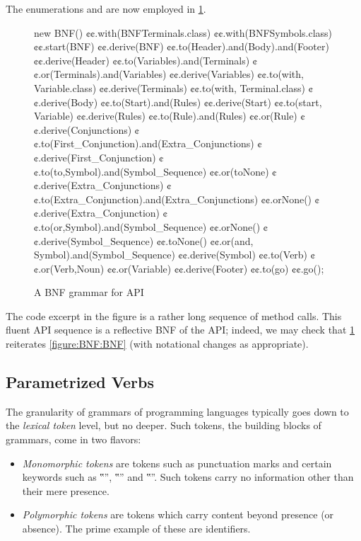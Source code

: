 The
enumerations  and
  are now employed in \cref{figure:BNF:fluent}.

\begin{figure}[htb]
  \begin{JAVA}[style=numbered]
new BNF()
  ¢¢.with(BNFTerminals.class)
  ¢¢.with(BNFSymbols.class)
  ¢¢.start(BNF)
  ¢¢.derive(BNF)
    ¢¢.to(Header).and(Body).and(Footer)
  ¢¢.derive(Header)
    ¢¢.to(Variables).and(Terminals)
    ¢¢.or(Terminals).and(Variables)
  ¢¢.derive(Variables)
    ¢¢.to(with, Variable.class)
  ¢¢.derive(Terminals)
    ¢¢.to(with, Terminal.class)
  ¢¢.derive(Body)
    ¢¢.to(Start).and(Rules)
  ¢¢.derive(Start)
    ¢¢.to(start, Variable)
  ¢¢.derive(Rules)
    ¢¢.to(Rule).and(Rules)
    ¢¢.or(Rule)
  ¢¢.derive(Conjunctions)
    ¢¢.to(First_Conjunction).and(Extra_Conjunctions)
  ¢¢.derive(First_Conjunction)
    ¢¢.to(to,Symbol).and(Symbol_Sequence)
    ¢¢.or(toNone)
  ¢¢.derive(Extra_Conjunctions)
    ¢¢.to(Extra_Conjunction).and(Extra_Conjunctions)
    ¢¢.orNone()
  ¢¢.derive(Extra_Conjunction)
    ¢¢.to(or,Symbol).and(Symbol_Sequence)
    ¢¢.orNone()
  ¢¢.derive(Symbol_Sequence)
    ¢¢.toNone()
    ¢¢.or(and, Symbol).and(Symbol_Sequence)
  ¢¢.derive(Symbol)
    ¢¢.to(Verb)
    ¢¢.or(Verb,Noun)
    ¢¢.or(Variable)
  ¢¢.derive(Footer)
    ¢¢.to(go)
¢¢.go();
  \end{JAVA}
  \caption{A BNF grammar for \Self API}
  \label{figure:BNF:fluent}
\end{figure}

The code excerpt in the figure is a rather long
sequence of method calls.
This fluent API sequence is a reflective BNF
of the \Self API;
indeed, we may check that \cref{figure:BNF:fluent} reiterates \cref{figure:BNF:BNF}
(with notational changes as appropriate).

\subsection{Parametrized Verbs}
The granularity of grammars of programming languages typically goes down to the \emph{lexical token} level,
but no deeper.
Such tokens, the building blocks of grammars, come in two flavors:
\begin{itemize}
  \item \emph{Monomorphic tokens} are tokens such as punctuation marks and
        certain keywords such as ‟”, ‟” and ‟”.
        Such tokens carry no information other than their mere presence.
  \item \emph{Polymorphic tokens} are tokens which carry content beyond
        presence (or absence). The prime example of these are identifiers.
\end{itemize}

